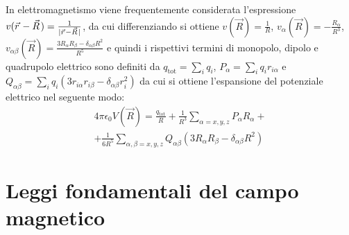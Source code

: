 \documentclass[a4paper,10pt]{article}
\begin{document}
\begin{multicols}{2}
In elettromagnetismo viene frequentemente considerata l'espressione $v(\vec r - \vec R) = \frac{1}{\abs{\vec r - \vec R}}$,
da cui differenziando si ottiene $v(\vec R) = \frac{1}{R}$, $v_\alpha(\vec R) = -\frac{R_\alpha}{R^3}$,
$v_{\alpha\beta}(\vec R) = \frac{3 R_\alpha R_\beta - \delta_{\alpha\beta} R^2}{R^5}$ e quindi i rispettivi termini di monopolo,
dipolo e quadrupolo elettrico sono definiti da $q_\text{tot} = \sum_i q_i$, $P_\alpha = \sum_i q_i r_{i\alpha}$ e
$Q_{\alpha\beta} = \sum_i q_i (3r_{i\alpha}r_{i\beta} - \delta_{\alpha\beta} r_i^2)$ da cui si ottiene l'espansione del potenziale
elettrico nel seguente modo:
\begin{align*}
  4\pi\epsilon_0 V(\vec R) = \frac{q_\text{tot}}{R} + \frac{1}{R^3} \sum_{\alpha = x,y,z} P_\alpha R_\alpha + \\
  + \frac{1}{6 R^5} \sum_{\alpha, \beta = x,y,z} Q_{\alpha\beta} (3R_\alpha R_\beta - \delta_{\alpha\beta} R^2)
\end{align*}

\section{Leggi fondamentali del campo magnetico}






\end{multicols}
\end{document}
